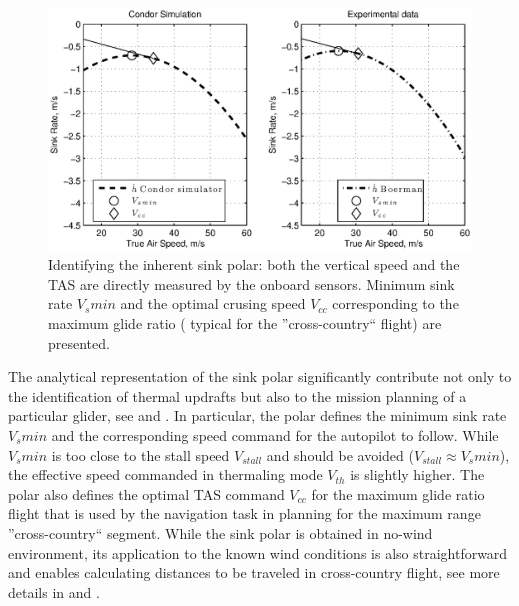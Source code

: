 \documentclass{ifacconf}
\begin{document}
\begin{figure}[thpb]
  \centering
  \includegraphics[scale=0.49]{Figures/Condor_Boermans_comparison.eps}
  \caption{Identifying the inherent sink polar: both the vertical speed and the TAS are directly measured by the onboard sensors. Minimum sink rate $V_s min$ and the optimal crusing speed $V_{cc}$ corresponding to the maximum glide ratio ( typical for the ''cross-country`` flight) are presented.}
  \label{fig:SinkPolar}
\end{figure}

The analytical representation of the sink polar significantly contribute  not only to the identification of thermal updrafts but also to the mission planning of a particular glider, see \cite{Piggott:1997} and \cite{FAA:2011}. In particular, the polar defines the minimum sink rate $V_{s}min$ and the corresponding speed command for the autopilot to follow. While $V_{s}min$ is too close to the stall speed $V_{stall}$ and should be avoided ($V_{stall} \approx V_{s}min$), the effective speed commanded in thermaling mode $V_{th}$ is slightly higher. The polar also defines the optimal TAS command  $V_{cc}$ for the maximum glide ratio flight that is used by the navigation task in planning for the maximum range ''cross-country`` segment. While the sink polar is obtained in no-wind environment, its application to the known wind conditions is also straightforward and enables calculating distances to be traveled in cross-country flight, see more details in \cite{Piggott:1997} and \cite{FAA:2011}.
\end{document}
